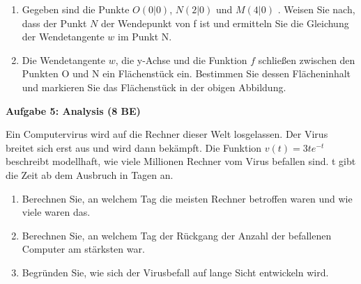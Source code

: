 \documentclass[a4paper,12pt]{article}
\newcommand{\Aufgabe}[1]{
  {
  \vspace*{0.5cm}
  \textsf{\textbf{Aufgabe #1}}
  \vspace*{0.2cm}
  
  }
}
\begin{document}
\begin{enumerate}[label={\alph*)}]
\item Gegeben sind die Punkte $O(0|0)$, $N(2|0)$  und $M(4|0)$ . Weisen Sie nach, dass der Punkt $N$ der Wendepunkt von f ist und ermitteln Sie die Gleichung der Wendetangente $ w$ im Punkt N. 
\item Die Wendetangente $ w$, die y-Achse und die Funktion $f$ schließen zwischen den Punkten O und N ein Flächenstück ein. Bestimmen Sie dessen Flächeninhalt und markieren Sie das Flächenstück in der obigen Abbildung.

\end{enumerate}

\Aufgabe{5: Analysis (8 BE)}

Ein Computervirus wird auf die Rechner dieser Welt losgelassen. Der Virus breitet sich erst
aus und wird dann bekämpft. Die Funktion $v (t )=3 t e^{-t}$
beschreibt modellhaft, wie viele
Millionen Rechner vom Virus befallen sind. t gibt die Zeit ab dem Ausbruch in Tagen an.
\begin{enumerate}[label={\alph*)}]
\item Berechnen Sie, an welchem Tag die meisten Rechner betroffen waren und wie viele waren das.
\item Berechnen Sie, an welchem Tag der Rückgang der Anzahl der befallenen Computer am stärksten war.
\item  Begründen Sie, wie sich der Virusbefall auf lange Sicht entwickeln wird.
\end{enumerate}

\newpage
\vspace*{-3\baselineskip}
\end{document}
